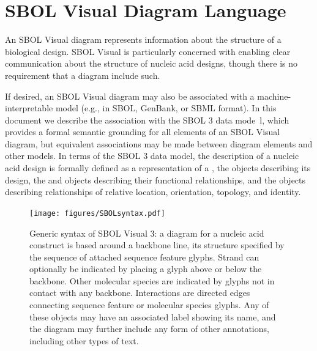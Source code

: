 \section{SBOL Visual Diagram Language}
\label{sec:language}


An SBOL Visual diagram represents information about the structure of a biological design.
SBOL Visual is particularly concerned with enabling clear communication about the structure of nucleic acid designs, though there is no requirement that a diagram include such.

If desired, an SBOL Visual diagram may also be associated with a machine-interpretable model (e.g., in SBOL, GenBank, or SBML format).
In this document we describe the association with the SBOL 3 data mode~\citep{SBOL3_0}l, which provides a formal semantic grounding for all elements of an SBOL Visual diagram, but equivalent associations may be made between diagram elements and other models.
%
In terms of the SBOL 3 data model, the description of a nucleic acid design is formally defined as a representation of a , the  objects describing its design, the  and  objects describing their functional relationships, and the  objects describing relationships of relative location, orientation, topology, and identity.

\begin{figure}[h!]
\centering
\texttt{[image: figures/SBOLsyntax.pdf]}
\caption{Generic syntax of SBOL Visual 3:  
a diagram for a nucleic acid construct is based around a backbone line, its structure specified by the sequence of attached sequence feature glyphs.  
Strand can optionally be indicated by placing a glyph above or below the backbone.  
Other molecular species are indicated by glyphs not in contact with any backbone.
Interactions are directed edges connecting sequence feature or molecular species glyphs.
Any of these objects may have an associated label showing its name, and the diagram may further include any form of other annotations, including other types of text.}
\label{f:syntax}
\end{figure}

